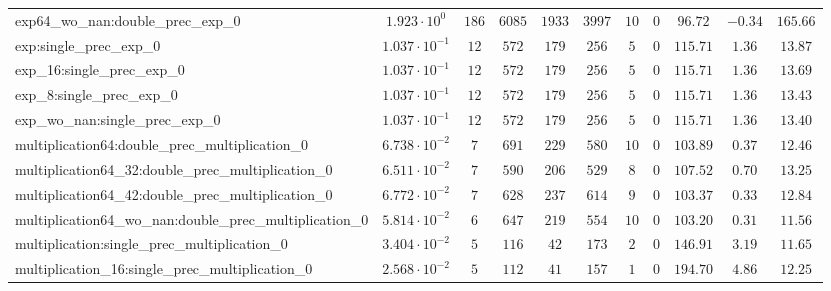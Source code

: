 \begin{tabular}{|l|c|c|c|c|c|c|c|c|c|c|}
exp64\_wo\_nan:double\_prec\_exp\_0                       & $ 1.923 \cdot 10^{0}  $ & $ 186    $ & $ 6085   $ & $ 1933  $ & $ 3997  $ & $ 10  $ & $ 0    $ & $ 96.72       $ & $ -0.34   $ & $ 165.66  $ \\
exp:single\_prec\_exp\_0                                  & $ 1.037 \cdot 10^{-1} $ & $ 12     $ & $ 572    $ & $ 179   $ & $ 256   $ & $ 5   $ & $ 0    $ & $ 115.71      $ & $ 1.36    $ & $ 13.87   $ \\
exp\_16:single\_prec\_exp\_0                              & $ 1.037 \cdot 10^{-1} $ & $ 12     $ & $ 572    $ & $ 179   $ & $ 256   $ & $ 5   $ & $ 0    $ & $ 115.71      $ & $ 1.36    $ & $ 13.69   $ \\
exp\_8:single\_prec\_exp\_0                               & $ 1.037 \cdot 10^{-1} $ & $ 12     $ & $ 572    $ & $ 179   $ & $ 256   $ & $ 5   $ & $ 0    $ & $ 115.71      $ & $ 1.36    $ & $ 13.43   $ \\
exp\_wo\_nan:single\_prec\_exp\_0                         & $ 1.037 \cdot 10^{-1} $ & $ 12     $ & $ 572    $ & $ 179   $ & $ 256   $ & $ 5   $ & $ 0    $ & $ 115.71      $ & $ 1.36    $ & $ 13.40   $ \\
multiplication64:double\_prec\_multiplication\_0          & $ 6.738 \cdot 10^{-2} $ & $ 7      $ & $ 691    $ & $ 229   $ & $ 580   $ & $ 10  $ & $ 0    $ & $ 103.89      $ & $ 0.37    $ & $ 12.46   $ \\
multiplication64\_32:double\_prec\_multiplication\_0      & $ 6.511 \cdot 10^{-2} $ & $ 7      $ & $ 590    $ & $ 206   $ & $ 529   $ & $ 8   $ & $ 0    $ & $ 107.52      $ & $ 0.70    $ & $ 13.25   $ \\
multiplication64\_42:double\_prec\_multiplication\_0      & $ 6.772 \cdot 10^{-2} $ & $ 7      $ & $ 628    $ & $ 237   $ & $ 614   $ & $ 9   $ & $ 0    $ & $ 103.37      $ & $ 0.33    $ & $ 12.84   $ \\
multiplication64\_wo\_nan:double\_prec\_multiplication\_0 & $ 5.814 \cdot 10^{-2} $ & $ 6      $ & $ 647    $ & $ 219   $ & $ 554   $ & $ 10  $ & $ 0    $ & $ 103.20      $ & $ 0.31    $ & $ 11.56   $ \\
multiplication:single\_prec\_multiplication\_0            & $ 3.404 \cdot 10^{-2} $ & $ 5      $ & $ 116    $ & $ 42    $ & $ 173   $ & $ 2   $ & $ 0    $ & $ 146.91      $ & $ 3.19    $ & $ 11.65   $ \\
multiplication\_16:single\_prec\_multiplication\_0        & $ 2.568 \cdot 10^{-2} $ & $ 5      $ & $ 112    $ & $ 41    $ & $ 157   $ & $ 1   $ & $ 0    $ & $ 194.70      $ & $ 4.86    $ & $ 12.25   $ \\

\end{tabular}
